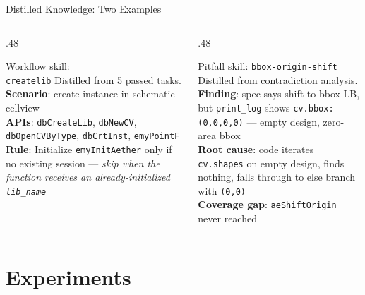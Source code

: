 \documentclass{beamer}
\begin{document}
\begin{frame}[fragile]{Distilled Knowledge: Two Examples}
    \begin{columns}
        \begin{column}{.48\textwidth}
            \begin{exampleblock}{Workflow skill:\\ \texttt{createlib}}
                \scriptsize
                Distilled from 5 passed tasks.\\[4pt]
                \textbf{Scenario}: create-instance-in-schematic-cellview\\
                \textbf{APIs}: \texttt{dbCreateLib}, \texttt{dbNewCV}, \texttt{dbOpenCVByType}, \texttt{dbCrtInst}, \texttt{emyPointF}\\[4pt]
                \textbf{Rule}: Initialize \texttt{emyInitAether} only if no existing session --- \emph{skip when the function receives an already-initialized \texttt{lib\_name}}
            \end{exampleblock}
        \end{column}
        \begin{column}{.48\textwidth}
            \begin{exampleblock}{Pitfall skill: \texttt{bbox-origin-shift}}
                \scriptsize
                Distilled from contradiction analysis.\\[4pt]
                \textbf{Finding}: spec says shift to bbox LB, but \texttt{print\_log} shows \texttt{cv.bbox: (0,0,0,0)} --- empty design, zero-area bbox\\[4pt]
                \textbf{Root cause}: code iterates \texttt{cv.shapes} on empty design, finds nothing, falls through to else branch with \texttt{(0,0)}\\[4pt]
                \textbf{Coverage gap}: \texttt{aeShiftOrigin} never reached
            \end{exampleblock}
        \end{column}
    \end{columns}
    \vfill
\end{frame}

\section{Experiments}
\end{document}

